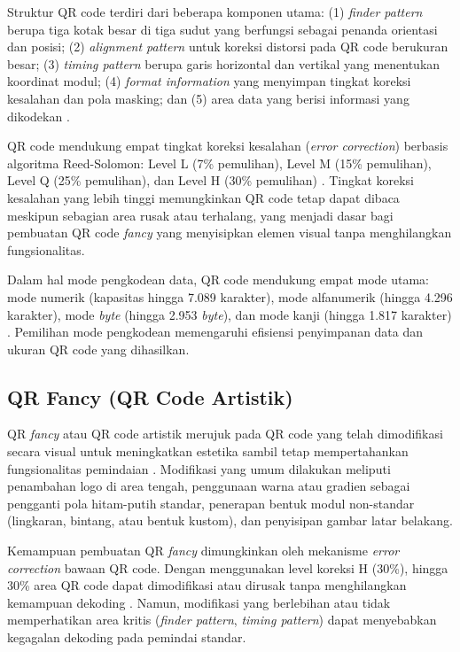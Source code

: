 \documentclass[conference]{IEEEtran}
\begin{document}
Struktur QR code terdiri dari beberapa komponen utama: (1) \textit{finder pattern} berupa tiga kotak besar di tiga sudut yang berfungsi sebagai penanda orientasi dan posisi; (2) \textit{alignment pattern} untuk koreksi distorsi pada QR code berukuran besar; (3) \textit{timing pattern} berupa garis horizontal dan vertikal yang menentukan koordinat modul; (4) \textit{format information} yang menyimpan tingkat koreksi kesalahan dan pola masking; dan (5) area data yang berisi informasi yang dikodekan \cite{iso_18004_2015}.

QR code mendukung empat tingkat koreksi kesalahan (\textit{error correction}) berbasis algoritma Reed-Solomon: Level L (7\% pemulihan), Level M (15\% pemulihan), Level Q (25\% pemulihan), dan Level H (30\% pemulihan) \cite{wave_qr_about}. Tingkat koreksi kesalahan yang lebih tinggi memungkinkan QR code tetap dapat dibaca meskipun sebagian area rusak atau terhalang, yang menjadi dasar bagi pembuatan QR code \textit{fancy} yang menyisipkan elemen visual tanpa menghilangkan fungsionalitas.

Dalam hal mode pengkodean data, QR code mendukung empat mode utama: mode numerik (kapasitas hingga 7.089 karakter), mode alfanumerik (hingga 4.296 karakter), mode \textit{byte} (hingga 2.953 \textit{byte}), dan mode kanji (hingga 1.817 karakter) \cite{iso_18004_2015}. Pemilihan mode pengkodean memengaruhi efisiensi penyimpanan data dan ukuran QR code yang dihasilkan.

\subsection{QR Fancy (QR Code Artistik)}

QR \textit{fancy} atau QR code artistik merujuk pada QR code yang telah dimodifikasi secara visual untuk meningkatkan estetika sambil tetap mempertahankan fungsionalitas pemindaian \cite{garateguy_qr_2014}. Modifikasi yang umum dilakukan meliputi penambahan logo di area tengah, penggunaan warna atau gradien sebagai pengganti pola hitam-putih standar, penerapan bentuk modul non-standar (lingkaran, bintang, atau bentuk kustom), dan penyisipan gambar latar belakang.

Kemampuan pembuatan QR \textit{fancy} dimungkinkan oleh mekanisme \textit{error correction} bawaan QR code. Dengan menggunakan level koreksi H (30\%), hingga 30\% area QR code dapat dimodifikasi atau dirusak tanpa menghilangkan kemampuan dekoding \cite{lin_aesthetic_2015}. Namun, modifikasi yang berlebihan atau tidak memperhatikan area kritis (\textit{finder pattern}, \textit{timing pattern}) dapat menyebabkan kegagalan dekoding pada pemindai standar.
\end{document}

